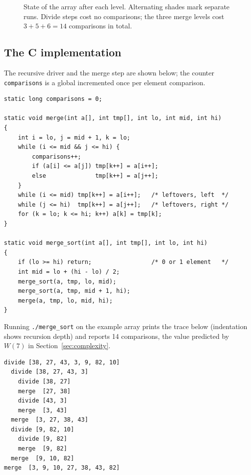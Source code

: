 \documentclass[11pt,a4paper]{article}
\theoremstyle{plain}
\theoremstyle{definition}
\newcommand{\snaprow}[4]{%
  \global\sx=0pt
  \node[anchor=east,font=\scriptsize,color=slate] at (-0.25,#1) {#2};
  \foreach \g [count=\gi] in {#3}{%
    \foreach \v in \g {%
      \ifodd\gi \node[sbox,fill=navy!10] at (\the\sx,#1) {\v};%
      \else \node[sbox,fill=teal!18] at (\the\sx,#1) {\v};\fi
      \global\advance\sx by 0.66cm}%
    \global\advance\sx by 0.32cm}%
  \node[anchor=west,font=\scriptsize,color=navy] at (6.45,#1) {#4};}
\begin{document}
\begin{figure}[H]
\centering
{}
\caption{State of the array after each level. Alternating shades mark separate runs. Divide steps cost no comparisons; the three merge levels cost $3+5+6=14$ comparisons in total.}
\label{fig:snapshots}
\end{figure}

\subsection{The C implementation}\label{sec:csoft}
The recursive driver and the merge step are shown below; the counter \texttt{comparisons} is a global incremented once per element comparison.
\begin{lstlisting}
static long comparisons = 0;

static void merge(int a[], int tmp[], int lo, int mid, int hi)
{
    int i = lo, j = mid + 1, k = lo;
    while (i <= mid && j <= hi) {
        comparisons++;
        if (a[i] <= a[j]) tmp[k++] = a[i++];
        else              tmp[k++] = a[j++];
    }
    while (i <= mid) tmp[k++] = a[i++];   /* leftovers, left  */
    while (j <= hi)  tmp[k++] = a[j++];   /* leftovers, right */
    for (k = lo; k <= hi; k++) a[k] = tmp[k];
}

static void merge_sort(int a[], int tmp[], int lo, int hi)
{
    if (lo >= hi) return;                 /* 0 or 1 element   */
    int mid = lo + (hi - lo) / 2;
    merge_sort(a, tmp, lo, mid);
    merge_sort(a, tmp, mid + 1, hi);
    merge(a, tmp, lo, mid, hi);
}
\end{lstlisting}
Running \texttt{./merge\_sort} on the example array prints the trace below (indentation shows recursion depth) and reports 14 comparisons, the value predicted by $W(7)$ in Section~\ref{sec:complexity}.
\begin{lstlisting}[numbers=none,basicstyle=\ttfamily\scriptsize]
divide [38, 27, 43, 3, 9, 82, 10]
  divide [38, 27, 43, 3]
    divide [38, 27]
    merge  [27, 38]
    divide [43, 3]
    merge  [3, 43]
  merge  [3, 27, 38, 43]
  divide [9, 82, 10]
    divide [9, 82]
    merge  [9, 82]
  merge  [9, 10, 82]
merge  [3, 9, 10, 27, 38, 43, 82]
\end{lstlisting}
\end{document}
